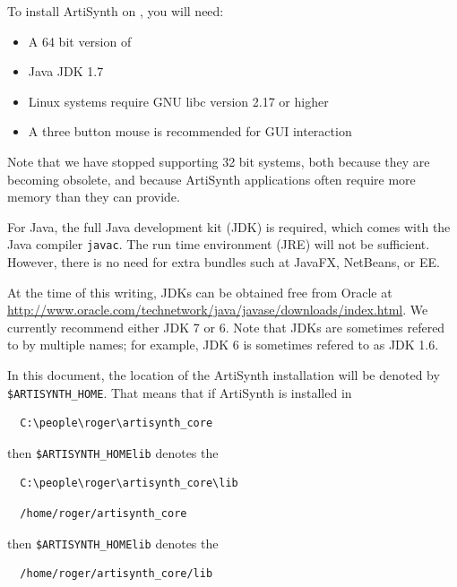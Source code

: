 To install ArtiSynth on \SYSTEM, you will need:

\begin{itemize}

\item A 64 bit version of \SYSTEM

\item Java JDK 1.7

\item Linux systems require GNU libc version 2.17 or higher

\item A three button mouse is recommended for GUI interaction

\end{itemize}

Note that we have stopped supporting 32 bit systems, both because they
are becoming obsolete, and because ArtiSynth applications often
require more memory than they can provide.

For Java, the full Java development kit (JDK) is required, which comes
with the Java compiler {\tt javac}. The run time environment (JRE)
will not be sufficient. However, there is no need for extra bundles
such at JavaFX, NetBeans, or EE.

At the time of this writing, JDKs can be obtained free from Oracle at
\href{http://www.oracle.com/technetwork/java/javase/downloads/index.html}
{http://www.oracle.com/technetwork/java/javase/downloads/index.html}.
We currently recommend either JDK 7 or 6. Note that JDKs are sometimes
refered to by multiple names; for example, JDK 6 is sometimes refered
to as JDK 1.6.

In this document, the location of the ArtiSynth installation \directory
will be denoted by {\tt \$ARTISYNTH\_HOME}.  That
means that if ArtiSynth is installed in
\ifWindows
\begin{verbatim}
  C:\people\roger\artisynth_core
\end{verbatim}
then {\tt \$ARTISYNTH\_HOME\SEP lib} denotes the \directory
\begin{verbatim}
  C:\people\roger\artisynth_core\lib
\end{verbatim}
\else
\begin{verbatim}
  /home/roger/artisynth_core
\end{verbatim}
then {\tt \$ARTISYNTH\_HOME\SEP lib} denotes the \directory
\begin{verbatim}
  /home/roger/artisynth_core/lib
\end{verbatim}
\fi


